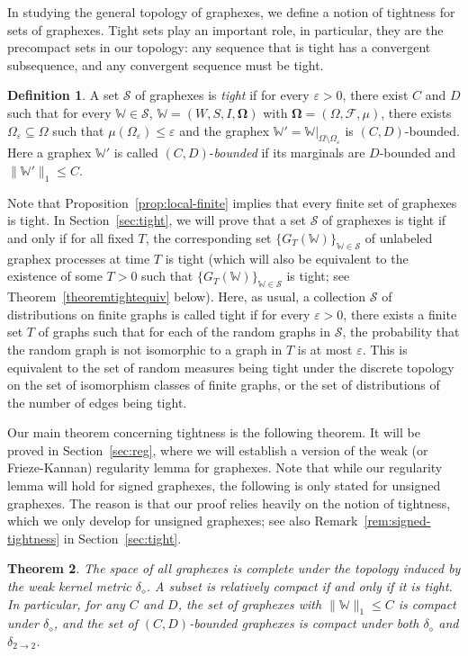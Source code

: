 \documentclass{amsart}
\numberwithin{equation}{section}
\numberwithin{figure}{section}
\newtheorem{theorem}{Theorem}[section]
\theoremstyle{definition}
\newtheorem{definition}[theorem]{Definition}
\theoremstyle{remark}
\newcommand{\bOmega}{{\mathbf{\Omega}}}
\newcommand{\cW}{\mathbb{W}}
\newcommand{\cS}{\mathcal{S}}
\newcommand{\cF}{\mathcal{F}}
\newcommand{\deltt}{\delta_{2\to 2}}
\def\delGP{\delta_\diamond}
\begin{document}
In studying the general topology of graphexes, we define a notion of
tightness for sets of graphexes. Tight sets play an important role, in
particular, they are the precompact sets in our topology: any sequence that
is tight has a convergent subsequence, and any convergent sequence must be
tight.

\begin{definition}
\label{def:tight} A set $\cS$ of graphexes is \emph{tight} if for every
$\varepsilon>0$, there exist $C$ and $D$ such that for every $\cW \in \cS$,
$\cW=(W,S,I,\bOmega)$ with $\bOmega=(\Omega,\cF,\mu)$, there exists
$\Omega_\varepsilon \subseteq \Omega$ such that $\mu(\Omega_\varepsilon) \le
\varepsilon$ and the graphex $\cW'=\cW|_{\Omega \setminus
\Omega_\varepsilon}$ is $(C,D)$-bounded. Here a graphex $\cW'$ is called
$(C,D)$-\emph{bounded} if its marginals are $D$-bounded and $\|\cW'\|_1 \le
C$.
\end{definition}

Note that Proposition~\ref{prop:local-finite} implies that every finite set
of graphexes is tight. In Section~\ref{sec:tight}, we will prove that a set
$\cS$ of graphexes is tight if and only if for all fixed $T$, the
corresponding set $\{G_T(\cW)\}_{\cW\in \cS}$ of unlabeled graphex processes
at time $T$ is tight (which will also be equivalent to the existence of some
$T>0$ such that $\{G_T(\cW)\}_{\cW\in \cS}$ is tight; see
Theorem~\ref{theoremtightequiv} below). Here, as usual, a collection
$\mathscr S$ of distributions on finite graphs is called tight if for every
$\varepsilon>0$, there exists a finite set $T$ of graphs such that for each
of the random graphs in $\mathscr S$, the probability that the random graph
is not isomorphic to a graph in $T$ is at most $\varepsilon$. This is
equivalent to the set of random measures being tight under the discrete
topology on the set of isomorphism classes of finite graphs, or the set of
distributions of the number of edges being tight.

Our main theorem concerning tightness is the following theorem. It will be
proved in Section~\ref{sec:reg}, where we will establish a version of the
weak (or Frieze-Kannan) regularity lemma for graphexes. Note that while our
regularity lemma will hold for signed graphexes, the following is only stated
for unsigned graphexes. The reason is that our proof relies heavily on the
notion of tightness, which we only develop for unsigned graphexes; see also
Remark~\ref{rem:signed-tightness} in Section~\ref{sec:tight}.

\begin{theorem}\label{thm:complete}
The space of all graphexes is complete under the topology induced by the weak
kernel metric $\delGP$. A subset is relatively compact if and only if it is
tight. In particular, for any $C$ and $D$, the set of graphexes with
$\|\cW\|_1 \le C$ is compact under $\delGP$, and the set of $(C,D)$-bounded
graphexes is compact under both $\delGP$ and $\deltt$.
\end{theorem}
\end{document}
